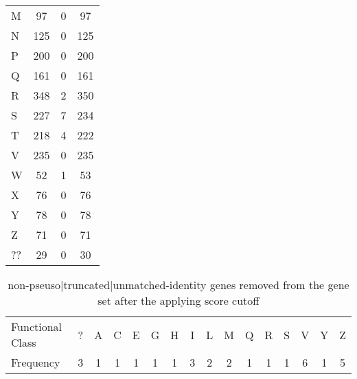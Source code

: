 \documentclass[table,
12pt, %
a4paper, %
oneside, %
headinclude,footinclude, %
BCOR5mm, %
]{scrartcl}
\begin{document}
\begin{table}[htbp]
\begin{adjustbox}{center}
\begin{tabular}{|lccc|}
      M           & 97           & 0       & 97     \\
      N           & 125          & 0       & 125    \\
      P           & 200          & 0       & 200    \\
      Q           & 161          & 0       & 161    \\
      R           & 348          & 2       & 350    \\
      S           & 227          & 7       & 234    \\
      T           & 218          & 4       & 222    \\
      V           & 235          & 0       & 235    \\
      W           & 52           & 1       & 53     \\
      X           & 76           & 0       & 76     \\
      Y           & 78           & 0       & 78     \\
      Z           & 71           & 0       & 71     \\
      ??          & 29           & 0       & 30     \\
      \hline
    \end{tabular}
    \label{table:genesummery}
  \end{adjustbox}
\end{table}


\begin{table}[htbp]
  \caption{non-pseuso|truncated|unmatched-identity genes removed from the gene set after the applying score cutoff}
  \begin{adjustbox}{width=10cm,center}
    \begin{tabular}{|l|ccccccccccccccc|}
      \hline
      Functional Class & ? & A & C & E & G & H & I & L & M & Q & R & S & V & Y & Z \\
      Frequency        & 3 & 1 & 1 & 1 & 1 & 1 & 3 & 2 & 2 & 1 & 1 & 1 & 6 & 1 & 5 \\
      \hline
    \end{tabular}
    \label{table:removedgenes}
  \end{adjustbox}
\end{table}
\end{document}
